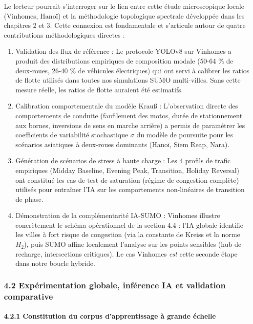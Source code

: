\documentclass[10pt, a4paper]{article}
\begin{document}
Le lecteur pourrait s'interroger sur le lien entre cette étude
microscopique locale (Vinhomes, Hanoï) et la méthodologie topologique
spectrale développée dans les chapitres 2 et 3. Cette connexion est
fondamentale et s'articule autour de quatre contributions
méthodologiques directes :

\begin{enumerate}
\def\labelenumi{\arabic{enumi}.}
\item
  Validation des flux de référence : Le protocole YOLOv8 sur Vinhomes a
  produit des distributions empiriques de composition modale (50-64 \%
  de deux-roues, 26-40 \% de véhicules électriques) qui ont servi à
  calibrer les ratios de flotte utilisés dans toutes nos simulations
  SUMO multi-villes. Sans cette mesure réelle, les ratios de flotte
  auraient été estimatifs.
\item
  Calibration comportementale du modèle Krauß : L'observation directe
  des comportements de conduite (faufilement des motos, durée de
  stationnement aux bornes, inversions de sens en marche arrière) a
  permis de paramétrer les coefficients de variabilité stochastique
  \(\sigma\) du modèle de poursuite pour les scénarios asiatiques à
  deux-roues dominants (Hanoï, Siem Reap, Nara).
\item
  Génération de scénarios de stress à haute charge : Les 4 profils de
  trafic empiriques (Midday Baseline, Evening Peak, Transition, Holiday
  Reversal) ont constitué les cas de test de saturation (régime de
  congestion complète) utilisés pour entraîner l'IA sur les
  comportements non-linéaires de transition de phase.
\item
  Démonstration de la complémentarité IA-SUMO : Vinhomes illustre
  concrètement le schéma opérationnel de la section 4.4 : l'IA globale
  identifie les villes à fort risque de congestion (via la constante de
  Kreiss et la norme \(H_2\)), puis SUMO affine localement l'analyse sur
  les points sensibles (hub de recharge, intersections critiques). Le
  cas Vinhomes \emph{est} cette seconde étape dans notre boucle hybride.
\end{enumerate}

\subsubsection{4.2 Expérimentation globale, inférence IA et validation
comparative}\label{expuxe9rimentation-globale-infuxe9rence-ia-et-validation-comparative}

\paragraph{4.2.1 Constitution du corpus d'apprentissage à grande
échelle}\label{constitution-du-corpus-dapprentissage-uxe0-grande-uxe9chelle}
\end{document}
